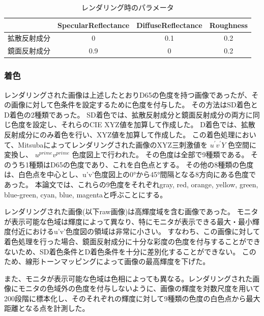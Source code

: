             \begin{table}[h]
                \centering
                \caption{レンダリング時のパラメータ}
                \begin{tabular}{|l||c|c|c|} \hline
                                           & SpecularReflectance & DiffuseReflectance & Roughness \\ \hline \hline
                    拡散反射成分           & 0                   & 0.1                & 0.2 \\ \hline
                    鏡面反射成分           & 0.9                 & 0                  & 0.2 \\ \hline
                \end{tabular}
            \end{table}
        
        \subsubsection{着色}

            レンダリングされた画像は上述したとおりD65の色度を持つ画像であったが、その画像に対して色条件を設定するために色度を付与した。
            その方法はSD着色とD着色の2種類であった。
            SD着色では、拡散反射成分と鏡面反射成分の両方に同じ色度を設定し、それらのCIE XYZ値を加算して作成した。
            D着色では、拡散反射成分にのみ着色を行い、XYZ値を加算して作成した。
            この着色処理において、Mitsubaによってレンダリングされた画像のXYZ三刺激値を $u^{\prime}v^{\prime}Y$ 色空間に変換し、 $u^{prime}v^{prime}$ 色度図上で行われた。
            その色度は全部で9種類である。
            そのうち1種類はD65の色度であり、これを白色点とする。
            その他の8種類の色度は、白色点を中心とし、u’v’色度図上の0°から45°間隔となる8方向にある色度であった。
            本論文では、これらの9色度をそれぞれgray, red, orange, yellow, green, blue-green, cyan, blue, magentaと呼ぶことにする。

            レンダリングされた画像(以下raw画像)は高輝度域を含む画像であった。
            モニタが表示可能な色域は輝度によって異なり、特にモニタが表示できる最大・最小輝度付近におけるu'v'色度図の領域は非常に小さい。
            すなわち、この画像に対して着色処理を行った場合、鏡面反射成分に十分な彩度の色度を付与することができないため、SD着色条件とD着色条件を十分に差別化することができない。
            このため、線形トーンマッピングによって画像の最高輝度を下げた。

            また、モニタが表示可能な色域は色相によっても異なる。レンダリングされた画像にモニタの色域外の色度を付与しないように、画像の輝度を対数尺度を用いて200段階に標本化し、そのそれぞれの輝度に対して9種類の色度の白色点から最大距離となる点を計測した。


